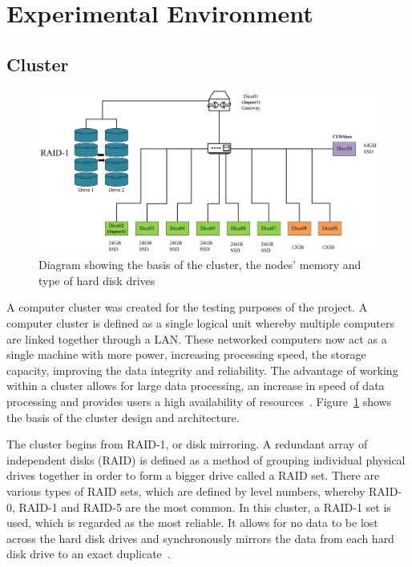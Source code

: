 \documentclass[10pt, conference]{IEEEtran}
\begin{document}
\section{Experimental Environment}
\label{sec: Experimental Environment}

\subsection{Cluster}
\label{sec: Cluster}
\begin{figure}[h!]
\renewcommand{\thefigure}{\arabic{figure}}
\centering
\includegraphics[scale=0.3]{Cluster.png}
\caption{Diagram showing the basis of the cluster, the nodes' memory and type of hard disk drives}
\label{fig: Cluster}
\end{figure}

A computer cluster was created for the testing purposes of the project. A computer cluster is defined as a single logical unit whereby multiple computers are linked together through a LAN. These networked computers now act as a single machine with more power, increasing processing speed, the storage capacity, improving the data integrity and reliability. The advantage of working within a cluster allows for large data processing, an increase in speed of data processing and provides users a high availability of resources~\cite{Cluster definition}. Figure~\ref{fig: Cluster} shows the basis of the cluster design and architecture.

The cluster begins from RAID-1, or disk mirroring. A redundant array of independent disks (RAID) is defined as a method of grouping individual physical drives together in order to form a bigger drive called a RAID set. There are various types of RAID sets, which are defined by level numbers, whereby RAID-0, RAID-1 and RAID-5 are the most common. In this cluster, a RAID-1 set is used, which is regarded as the most reliable. It allows for no data to be lost across the hard disk drives and synchronously mirrors the data from each hard disk drive to an exact duplicate~\cite{RAID}.
\end{document}
